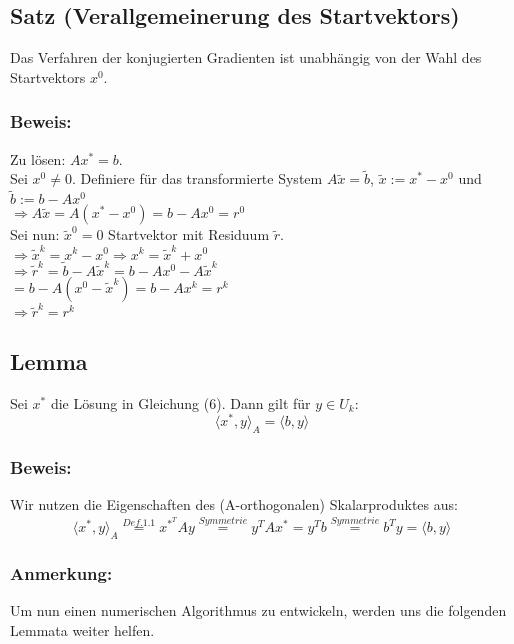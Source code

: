 \documentclass{article}
\begin{document}
\subsection{Satz (Verallgemeinerung des Startvektors)}
Das Verfahren der konjugierten Gradienten ist unabhängig von der Wahl des Startvektors $x^{0}$.

\subsubsection{Beweis:}
Zu lösen: $Ax^{*} = b$.
\\Sei $x^{0} \ne 0$. Definiere für das transformierte System $A\tilde x = \tilde b$, $\tilde x := x^{*} - x^{0}$ und $\tilde b := b - Ax^{0}$
\\$\Longrightarrow A\tilde x = A(x^{*} - x^{0}) = b - Ax^{0} = r^{0}$
\\Sei nun: $\tilde x^{0} = 0$ Startvektor mit Residuum $\tilde r$.
\\$\Longrightarrow \tilde x^{k} = x^{k} - x^{0} \Longrightarrow x^{k} = \tilde x^{k} + x^{0}$
\\$\Longrightarrow \tilde r^{k} = \tilde b - A\tilde x^{k} = b - Ax^{0} - A\tilde x^{k}$
\\$= b - A(x^{0} - \tilde x^{k}) = b - Ax^{k} = r^{k}$
\\$\Longrightarrow \tilde r^{k} = r^{k}$

\subsection{Lemma}
Sei $x^{*}$ die Lösung in Gleichung (6). Dann gilt für $y \in U_{k}$:
\begin{equation}
\langle x^{*}, y \rangle _{A} = \langle b, y \rangle
\end{equation}

\subsubsection{Beweis:}
Wir nutzen die Eigenschaften des (A-orthogonalen) Skalarproduktes aus:
\begin{equation*}
\langle x^{*}, y \rangle _{A} \overset{Def. 1.1}{=} x^{{*}^{T}}Ay \overset{Symmetrie}{=} y^{T}Ax^{*} = y^{T}b \overset{Symmetrie}{=} b^{T}y = \langle b, y \rangle
\end{equation*}

\subsubsection{Anmerkung:}
Um nun einen numerischen Algorithmus zu entwickeln, werden uns die folgenden Lemmata weiter helfen.
\end{document}
